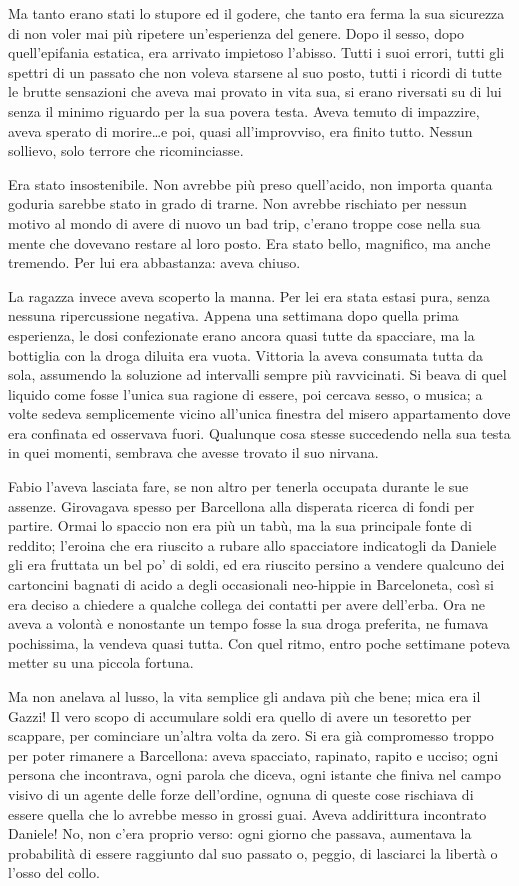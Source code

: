 Ma tanto erano stati lo stupore ed il godere, che tanto era ferma la sua sicurezza di non voler mai più ripetere un'esperienza del genere. Dopo il sesso, dopo quell'epifania estatica, era arrivato impietoso l'abisso. Tutti i suoi errori, tutti gli spettri di un passato che non voleva starsene al suo posto, tutti i ricordi di tutte le brutte sensazioni che aveva mai provato in vita sua, si erano riversati su di lui senza il minimo riguardo per la sua povera testa. Aveva temuto di impazzire, aveva sperato di morire\ldots e poi, quasi all'improvviso, era finito tutto. Nessun sollievo, solo terrore che ricominciasse.

Era stato insostenibile. Non avrebbe più preso quell'acido, non importa quanta goduria sarebbe stato in grado di trarne. Non avrebbe rischiato per nessun motivo al mondo di avere di nuovo un bad trip, c'erano troppe cose nella sua mente che dovevano restare al loro posto. Era stato bello, magnifico, ma anche tremendo. Per lui era abbastanza: aveva chiuso.

La ragazza invece aveva scoperto la manna. Per lei era stata estasi pura, senza nessuna ripercussione negativa. Appena una settimana dopo quella prima esperienza, le dosi confezionate erano ancora quasi tutte da spacciare, ma la bottiglia con la droga diluita era vuota. Vittoria la aveva consumata tutta da sola, assumendo la soluzione ad intervalli sempre più ravvicinati. Si beava di quel liquido come fosse l'unica sua ragione di essere, poi cercava sesso, o musica; a volte sedeva semplicemente vicino all'unica finestra del misero appartamento dove era confinata ed osservava fuori. Qualunque cosa stesse succedendo nella sua testa in quei momenti, sembrava che avesse trovato il suo nirvana.

Fabio l'aveva lasciata fare, se non altro per tenerla occupata durante le sue assenze. Girovagava spesso per Barcellona alla disperata ricerca di fondi per partire. Ormai lo spaccio non era più un tabù, ma la sua principale fonte di reddito; l'eroina che era riuscito a rubare allo spacciatore indicatogli da Daniele gli era fruttata un bel po' di soldi, ed era riuscito persino a vendere qualcuno dei cartoncini bagnati di acido a degli occasionali neo-hippie in Barceloneta, così si era deciso a chiedere a qualche collega dei contatti per avere dell'erba. Ora ne aveva a volontà e nonostante un tempo fosse la sua droga preferita, ne fumava pochissima, la vendeva quasi tutta. Con quel ritmo, entro poche settimane poteva metter su una piccola fortuna.

Ma non anelava al lusso, la vita semplice gli andava più che bene; mica era il Gazzi! Il vero scopo di accumulare soldi era quello di avere un tesoretto per scappare, per cominciare un'altra volta da zero. Si era già compromesso troppo per poter rimanere a Barcellona: aveva spacciato, rapinato, rapito e ucciso; ogni persona che incontrava, ogni parola che diceva, ogni istante che finiva nel campo visivo di un agente delle forze dell'ordine, ognuna di queste cose rischiava di essere quella che lo avrebbe messo in grossi guai. Aveva addirittura incontrato Daniele! No, non c'era proprio verso: ogni giorno che passava, aumentava la probabilità di essere raggiunto dal suo passato o, peggio, di lasciarci la libertà o l'osso del collo.

